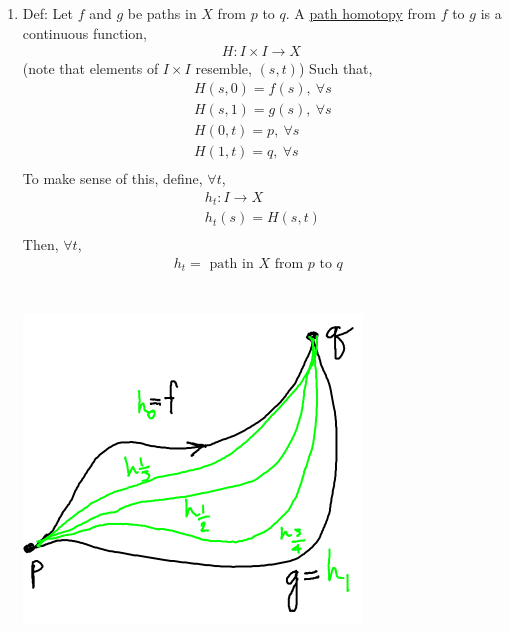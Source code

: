\begin{enumerate}
\begin{minipage}[c]{\linewidth}
\begin{center}
                \end{center}
            \end{minipage}\\
        \item Def: Let $f$ and $g$ be paths in $X$ from $p$ to $q$. A \underline{path homotopy} from $f$ to $g$ is a continuous function,
            \begin{align*}
                H: I\times I \rightarrow X\
            \end{align*}
            (note that elements of $I\times I$ resemble, $(s,t)$)
            Such that,
            \begin{align*}
                H(s,0)=f(s),\ \forall s\\
                H(s,1)=g(s),\ \forall s\\
                H(0,t)=p,\ \forall s\\
                H(1,t)=q,\ \forall s\\
            \end{align*}
            To make sense of this, define, $\forall t$,
            \begin{align*}
                h_t: I\rightarrow X\\
                h_t(s)=H(s,t)\\
            \end{align*}
            Then, $\forall t$,
            \begin{align*}
                h_t= \text{ path in $X$ from $p$ to $q$ }\\
            \end{align*}\\
            \begin{minipage}[c]{\linewidth}
                \begin{center}
                \includegraphics[]{images/homotopy_class.png}

\end{center}
\end{minipage}
\end{enumerate}
